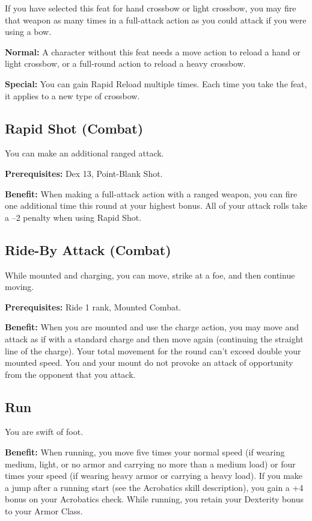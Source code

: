 If you have selected this feat for hand crossbow or light crossbow, you may fire that weapon as many times in a full-attack action as you could attack if you were using a bow.
				
\textbf{Normal:} A character without this feat needs a move action to reload a hand or light crossbow, or a full-round action to reload a heavy crossbow. 
				
\textbf{Special:} You can gain Rapid Reload multiple times. Each time you take the feat, it applies to a new type of crossbow.
				
\subsection{Rapid Shot (Combat)}

				
You can make an additional ranged attack.
				
\textbf{Prerequisites:} Dex 13, Point-Blank Shot.
				
\textbf{Benefit:} When making a full-attack action with a ranged weapon, you can fire one additional time this round at your highest bonus. All of your attack rolls take a --2 penalty when using Rapid Shot.
				
\subsection{Ride-By Attack (Combat)}

				
While mounted and charging, you can move, strike at a foe, and then continue moving.
				
\textbf{Prerequisites:} Ride 1 rank, Mounted Combat.
				
\textbf{Benefit:} When you are mounted and use the charge action, you may move and attack as if with a standard charge and then move again (continuing the straight line of the charge). Your total movement for the round can't exceed double your mounted speed. You and your mount do not provoke an attack of opportunity from the opponent that you attack.
				
\subsection{Run}

				
You are swift of foot.
				
\textbf{Benefit:} When running, you move five times your normal speed (if wearing medium, light, or no armor and carrying no more than a medium load) or four times your speed (if wearing heavy armor or carrying a heavy load). If you make a jump after a running start (see the Acrobatics skill description), you gain a +4 bonus on your Acrobatics check. While running, you retain your Dexterity bonus to your Armor Class.
				
